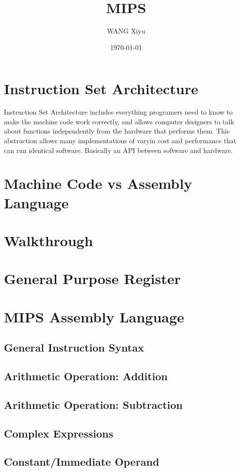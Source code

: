 \documentclass[12pt]{article} %
\title{MIPS}
\author{WANG Xiyu}
\date{\today}
\begin{document}
\maketitle

\tableofcontents %

\section{Instruction Set Architecture}
Instruction Set Architecture includes everything programers need to know to make the machine code work correctly, and allows computer designers to talk about functions independently from the hardware that performs them. 
This abstraction allows many implementations of varyin cost and performance that can run identical software. Basically an API between software and hardware.
\section{Machine Code vs Assembly Language}
\section{Walkthrough}

\section{General Purpose Register}
\section{MIPS Assembly Language}
\subsection{General Instruction Syntax}
\subsection{Arithmetic Operation: Addition}
\subsection{Arithmetic Operation: Subtraction}
\subsection{Complex Expressions}
\subsection{Constant/Immediate Operand}
\end{document}
